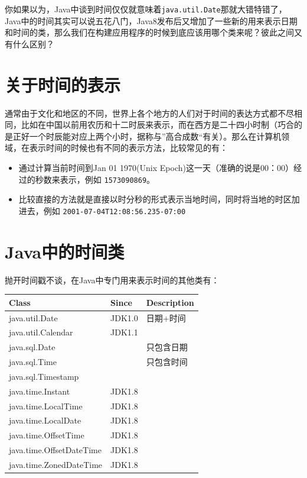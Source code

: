 \documentclass[12pt]{article}
\begin{document}
\makeblogtitle

你如果以为，Java中谈到时间仅仅就意味着\texttt{java.util.Date}那就大错特错了，Java中的时间其实可以说五花八门，Java8发布后又增加了一些新的用来表示日期和时间的类，那么我们在构建应用程序的时候到底应该用哪个类来呢？彼此之间又有什么区别？

\section{关于时间的表示}\label{ux5173ux4e8eux65f6ux95f4ux7684ux8868ux793a}

通常由于文化和地区的不同，世界上各个地方的人们对于时间的表达方式都不尽相同，比如在中国以前用农历和十二时辰来表示，而在西方是二十四小时制（巧合的是正好一个时辰能对应上两个小时，据称与''高合成数``有关）。那么在计算机领域，在表示时间的时候也有不同的表示方法，比较常见的有：

\begin{itemize}
\tightlist
\item
  通过计算当前时间到Jan 01 1970(Unix Epoch)这一天（准确的说是00：00）经过的秒数来表示，例如 \texttt{1573090869}。
\item
  比较直接的方法就是直接以时分秒的形式表示当地时间，同时将当地的时区加进去，例如 \texttt{2001-07-04T12:08:56.235-07:00}
\end{itemize}

\section{Java中的时间类}\label{javaux4e2dux7684ux65f6ux95f4ux7c7b}

抛开时间戳不谈，在Java中专门用来表示时间的其他类有：

{\def\LTcaptype{none} %
\begin{longtable}[]{@{}lll@{}}
\toprule\noalign{}
Class & Since & Description \\
\midrule\noalign{}
\endhead
\bottomrule\noalign{}
\endlastfoot
java.util.Date & JDK1.0 & 日期+时间 \\
java.util.Calendar & JDK1.1 & \\
java.sql.Date & & 只包含日期 \\
java.sql.Time & & 只包含时间 \\
java.sql.Timestamp & & \\
java.time.Instant & JDK1.8 & \\
java.time.LocalTime & JDK1.8 & \\
java.time.LocalDate & JDK1.8 & \\
java.time.OffsetTime & JDK1.8 & \\
java.time.OffsetDateTime & JDK1.8 & \\
java.time.ZonedDateTime & JDK1.8 & \\
\end{longtable}
}
\end{document}
